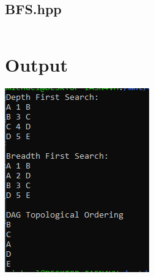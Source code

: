 \documentclass{article}
\begin{document}
\subsection{BFS.hpp}
\inputminted{c++}{../include/BFS.hpp}

\section{Output}
\includegraphics[]{output.png}
\end{document}
